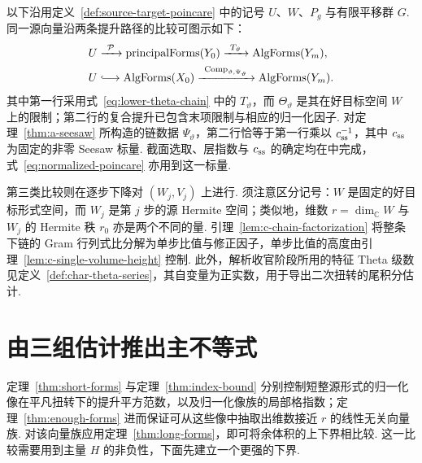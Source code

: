 以下沿用定义~\ref{def:source-target-poincare} 中的记号 $U$、$W$、$P_g$ 与有限平移群 $G$. 同一源向量沿两条提升路径的比较可图示如下：
\begin{equation}
\label{eq:lift-comparison}
\begin{aligned}
 U &\xrightarrow{\ \mathcal P\ }\operatorname{principalForms}(Y_0)
     \xrightarrow{\ T_\vartheta\ }\operatorname{AlgForms}(Y_m),\\
 U &\lhook\joinrel\longrightarrow \operatorname{AlgForms}(X_0)
     \xrightarrow{\ \operatorname{Comp}_{\vartheta,\Psi_\vartheta}\ }
        \operatorname{AlgForms}(Y_m).
\end{aligned}
\end{equation}
其中第一行采用式~\eqref{eq:lower-theta-chain} 中的 $T_\vartheta$，而 $\Theta_\vartheta$ 是其在好目标空间 $W$ 上的限制；第二行的复合提升已包含末项限制与相应的归一化因子. 对定理~\ref{thm:a-seesaw} 所构造的链数据 $\Psi_\vartheta$，第二行恰等于第一行乘以 $c_{\rm ss}^{-1}$，其中 $c_{\rm ss}$ 为固定的非零 Seesaw 标量. 截面选取、层指数与 $c_{\rm ss}$ 的确定均在中完成，式~\eqref{eq:normalized-poincare} 亦用到这一标量.

第三类比较则在逐步下降对 $(W_j,V_j)$ 上进行. 须注意区分记号：$W$ 是固定的好目标形式空间，而 $W_j$ 是第 $j$ 步的源 Hermite 空间；类似地，维数 $r=\dim_{\mathbb C}W$ 与 $W_j$ 的 Hermite 秩 $r_0$ 亦是两个不同的量. 引理~\ref{lem:c-chain-factorization} 将整条下链的 Gram 行列式比分解为单步比值与修正因子，单步比值的高度由引理~\ref{lem:c-single-volume-height} 控制. 此外，解析收官阶段所用的特征 Theta 级数见定义~\ref{def:char-theta-series}，其自变量为正实数，用于导出二次扭转的尾积分估计.

\section{由三组估计推出主不等式}
\label{sec:main-inequality}

定理~\ref{thm:short-forms} 与定理~\ref{thm:index-bound} 分别控制短整源形式的归一化像在平凡扭转下的提升平方范数，以及归一化像族的局部格指数；定理~\ref{thm:enough-forms} 进而保证可从这些像中抽取出维数接近 $r$ 的线性无关向量族. 对该向量族应用定理~\ref{thm:long-forms}，即可将余体积的上下界相比较. 这一比较需要用到主量 $H$ 的非负性，下面先建立一个更强的下界.

